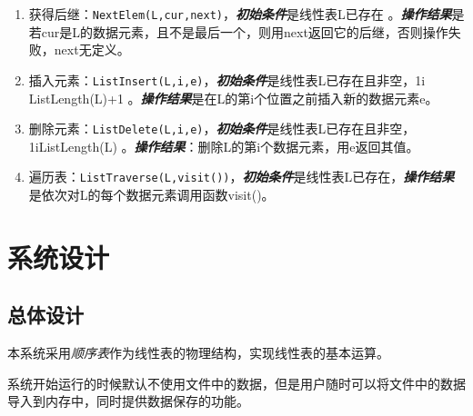 \begin{enumerate}
\item 获得后继：\texttt{NextElem(L,cur,next)}，\newline \textbf{\emph{初始条件}}是线性表L已存在 。\newline \textbf{\emph{操作结果}}是若cur是L的数据元素，且不是最后一个，则用next返回它的后继，否则操作失败，next无定义。
\item 插入元素：\texttt{ListInsert(L,i,e)}，\newline \textbf{\emph{初始条件}}是线性表L已存在且非空，1\le i \le ListLength(L)+1 。\newline \textbf{\emph{操作结果}}是在L的第i个位置之前插入新的数据元素e。
\item 删除元素：\texttt{ListDelete(L,i,e)}，\newline \textbf{\emph{初始条件}}是线性表L已存在且非空，1\le i\le ListLength(L) 。\newline \textbf{\emph{操作结果}}：删除L的第i个数据元素，用e返回其值。
\item 遍历表：\texttt{ListTraverse(L,visit())}，\newline \textbf{\emph{初始条件}}是线性表L已存在，\newline \textbf{\emph{操作结果}}是依次对L的每个数据元素调用函数visit()。
\end{enumerate}
\section{系统设计}
\subsection{总体设计}
本系统采用\emph{顺序表}作为线性表的物理结构，实现线性表的基本运算。
\par
系统开始运行的时候默认不使用文件中的数据，但是用户随时可以将文件中的数据导入到内存中，同时提供数据保存的功能。
